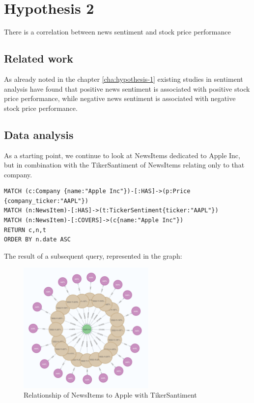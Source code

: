 \newpage
\section{Hypothesis 2}
\label{cha:hypothesis-2}
There is a correlation between news sentiment and stock price performance
\subsection{Related work}
As already noted in the chapter \ref{cha:hypothesis-1}
existing studies in sentiment analysis have found that positive news sentiment is associated with positive stock price performance, while negative news sentiment is associated with negative stock price performance.\cite{kalyani2016stock}
\subsection{Data analysis}
As a starting point, we continue to look at NewsItems dedicated to Apple Inc, but in combination with the TikerSantiment of NewsItems relating only to that company. 
\begin{lstlisting}[caption={Relationship of NewsItems to Apple Stock with TikerSantiment}, label={lst:newsItems_tikerSantiment_apple},captionpos=b]
MATCH (c:Company {name:"Apple Inc"})-[:HAS]->(p:Price {company_ticker:"AAPL"})
MATCH (n:NewsItem)-[:HAS]->(t:TickerSentiment{ticker:"AAPL"})
MATCH (n:NewsItem)-[:COVERS]->(c{name:"Apple Inc"})
RETURN c,n,t
ORDER BY n.date ASC
\end{lstlisting}

The result of a subsequent query, represented in the graph:
\begin{figure}[h]
 \centering
 \includegraphics[width=0.6\textwidth]{images/apple_news_ticker_sentiment_graph.png}
 \caption{Relationship of NewsItems to Apple with TikerSantiment }
 \label{fig:apple_news_ticker_sentiment_graph}
\end{figure}

